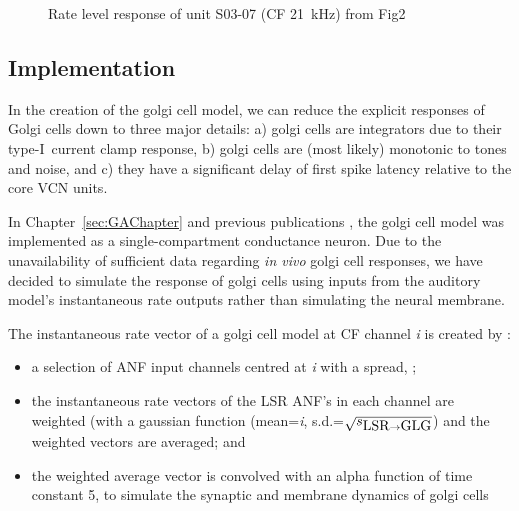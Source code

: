\medskip{}

   

\begin{figure}[htb]
  \centering
{}
\caption{Rate level response of unit S03-07 (CF 21~kHz) from Fig2
  \citep{GhoshalKim:1997} }
\end{figure}




\newpage
\subsection{Implementation}

In the creation of the golgi cell model, we can reduce the explicit
responses of Golgi cells down to three major details: a) golgi cells are integrators due to their type-I~current clamp response, b) golgi cells are (most likely) monotonic to tones and noise, and
c) they have a significant delay of first spike latency relative to the core VCN units.


In Chapter~\ref{sec:GAChapter} and previous publications \citep{EagerGraydenEtAl:2006a}, the golgi cell model was implemented as a single-compartment conductance  neuron. Due to the unavailability of sufficient data regarding \emph{in vivo}
golgi cell responses, we have decided to simulate the response of
golgi cells using inputs from the auditory model's instantaneous rate outputs rather
than simulating the neural membrane. 



The instantaneous rate vector of a golgi cell model at CF channel
\emph{i} is created by :
\begin{itemize}
 \item a selection of ANF input channels centred at \emph{i} with a
 spread, \sLSRGLG;
 \item the instantaneous rate vectors of the LSR ANF's in each channel
 are weighted (with a gaussian function (mean=\emph{i},
 s.d.=$\sqrt{\protect s_{\protect\mbox{LSR} \to \mbox{GLG}}}$) and the weighted vectors are averaged; and
 \item the weighted average vector is convolved with an alpha function
 of time constant 5, to simulate the synaptic and membrane dynamics of
 golgi cells
\end{itemize}

